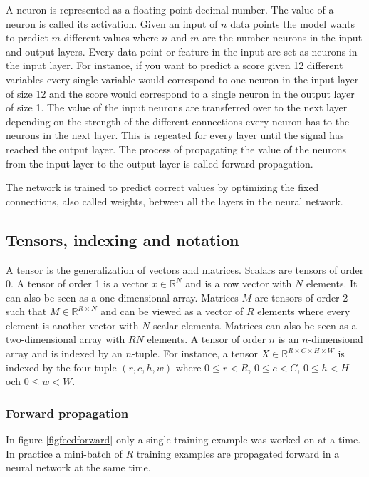 \documentclass[a4paper,11pt,twoside]{article}
\begin{document}
A neuron is represented as a floating point decimal number. The value of a neuron is called its activation. Given an input of $n$ data points the model wants to predict $m$ different values where $n$ and $m$ are the number neurons in the input and output layers. Every data point or feature in the input are set as neurons in the input layer. For instance, if you want to predict a score given 12 different variables every single variable would correspond to one neuron in the input layer of size 12 and the score would correspond to a single neuron in the output layer of size 1. The value of the input neurons are transferred over to the next layer depending on the strength of the different connections every neuron has to the neurons in the next layer. This is repeated for every layer until the signal has reached the output layer. The process of propagating the value of the neurons from the input layer to the output layer is called forward propagation. \cite{cs231n}

The network is trained to predict correct values by optimizing the fixed connections, also called weights, between all the layers in the neural network. \cite{cs231n}


\subsection{Tensors, indexing and notation}
A tensor is the generalization of vectors and matrices. Scalars are tensors of order 0. A tensor of order 1 is a vector $x \in \mathbb{R}^N$ and is a row vector with $N$ elements. It can also be seen as a one-dimensional array. Matrices $M$ are tensors of order 2 such that $M \in \mathbb{R}^{R \times N}$ and can be viewed as a vector of $R$ elements where every element is another vector with $N$ scalar elements. Matrices can also be seen as a two-dimensional array with $RN$ elements. A tensor of order $n$ is an $n$-dimensional array and is indexed by an $n$-tuple. For instance, a tensor $X \in \mathbb{R}^{R \times C \times H \times W}$ is indexed by the four-tuple $(r,c,h,w)$ where $0 \leq r < R$, $0 \leq c < C$, $0 \leq h < H$ och $0 \leq w < W$. \cite{cs231n}

\subsubsection{Forward propagation}
In figure \ref{figfeedforward} only a single training example was worked on at a time. In practice a mini-batch of $R$ training examples are propagated forward in a neural network at the same time. \cite{cs231n} \cite{wikiStanford}
\end{document}

